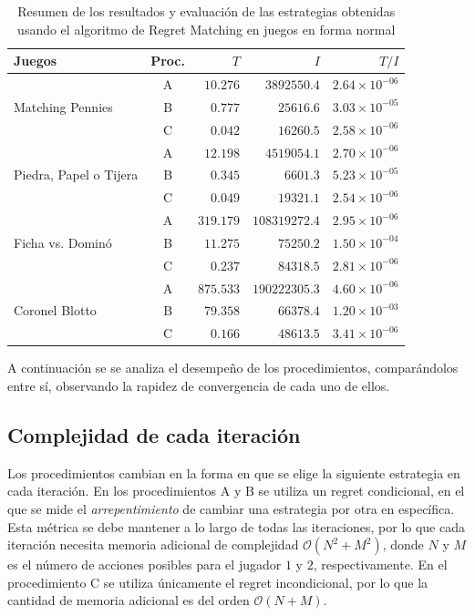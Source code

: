 \begin{table}[htpb]
    \centering
    \begin{tabular}{l | c |r r r}
        Juegos & Proc. & $T$ & $I$ & $T/I$ \\ \hline
        \multirow{3}{*}{Matching Pennies}
            & A & $10.276$ & $3892550.4$ & $2.64 {\times} 10^{-06}$ \\
            & B &  $0.777$ &   $25616.6$ & $3.03 {\times} 10^{-05}$ \\
            & C &  $0.042$ &   $16260.5$ & $2.58 {\times} 10^{-06}$ \\ \hline
        \multirow{3}{*}{Piedra, Papel o Tijera}
            & A & $12.198$ & $4519054.1$ & $2.70 {\times} 10^{-06}$ \\
            & B &  $0.345$ &    $6601.3$ & $5.23 {\times} 10^{-05}$ \\
            & C &  $0.049$ &   $19321.1$ & $2.54 {\times} 10^{-06}$ \\ \hline
        \multirow{3}{*}{Ficha vs. Dominó}
            & A & $319.179$ & $108319272.4$ & $2.95 {\times} 10^{-06}$ \\
            & B &  $11.275$ &     $75250.2$ & $1.50 {\times} 10^{-04}$ \\
            & C &   $0.237$ &     $84318.5$ & $2.81 {\times} 10^{-06}$ \\ \hline
        \multirow{3}{*}{Coronel Blotto}
            & A & $875.533$ & $190222305.3$ & $4.60 {\times} 10^{-06}$ \\
            & B &  $79.358$ &     $66378.4$ & $1.20 {\times} 10^{-03}$ \\
            & C &   $0.166$ &     $48613.5$ & $3.41 {\times} 10^{-06}$ \\ \hline
    \end{tabular}
    \caption{Resumen de los resultados y evaluación de las estrategias obtenidas usando el algoritmo de Regret Matching en juegos en forma normal}
    \label{tab:resumen-regret-tiempo-RM}
\end{table}

A continuación se se analiza el desempeño de los procedimientos, comparándolos entre sí, observando la rapidez de convergencia de cada uno de ellos.

\subsection{Complejidad de cada iteración}

Los procedimientos cambian en la forma en que se elige la siguiente estrategia en cada iteración. En los procedimientos A y B se utiliza un regret condicional, en el que se mide el \textit{arrepentimiento} de cambiar una estrategia por otra en específica. Esta métrica se debe mantener a lo largo de todas las iteraciones, por lo que cada iteración necesita memoria adicional de complejidad $\mathcal{O}(N^2 + M^2)$, donde $N$ y $M$ es el número de acciones posibles para el jugador $1$ y $2$, respectivamente. En el procedimiento C se utiliza únicamente el regret incondicional, por lo que la cantidad de memoria adicional es del orden $\mathcal{O}(N + M)$.

